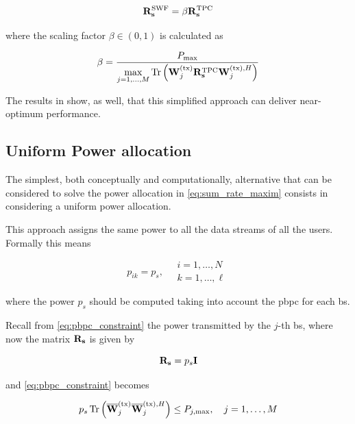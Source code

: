 \begin{equation} \label{eq:power_allocation_scaled}
    \mathbf{R}_{\mathbf{s}}^{\text{SWF}} = \beta \mathbf{R}_{\mathbf{s}}^{\text{TPC}}
\end{equation}

\noindent
where the scaling factor $\beta \in \left(0, 1\right)$ is calculated as

\begin{equation} \label{eq:scaling_factor}
    \beta = \frac{P_{\max}}{\max\limits_{j=1, \ldots, M} \operatorname*{Tr}\left(
    \mathbf{W}^{(\text{tx})}_j \mathbf{R}_{\mathbf{s}}^{\text{TPC}} \mathbf{W}^{(\text{tx}),H}_j \right)}
\end{equation}

The results in \cite{zhang09} show, as well, that this simplified approach can
deliver near-optimum performance.

\subsection{Uniform Power allocation}\label{ssec:uniform_allocation}

The simplest, both conceptually and computationally, alternative that can be
considered to solve the power allocation in \eqref{eq:sum_rate_maxim} consists
in considering a uniform power allocation.

This approach assigns the same power to all the data streams of all the
users. Formally this means

\begin{equation} \label{eq:equal_power}
    p_{ik} = p_{s}, \quad \begin{array}{l}
        i = 1, \ldots, N \\
        k = 1, \ldots, \ell
    \end{array}
\end{equation}

\noindent
where the power $p_s$ should be computed taking into account the \gls{pbpc} for
each \gls{bs}.

Recall from \eqref{eq:pbpc_constraint} the power transmitted by the $j$-th
\gls{bs}, where now the matrix $\mathbf{R}_{\mathbf{s}}$ is given by

\begin{equation} \label{eq:rs_equal}
    \mathbf{R}_{\mathbf{s}} = p_s \mathbf{I}
\end{equation}

\noindent
and \eqref{eq:pbpc_constraint} becomes

\begin{equation} \label{eq:pbpc_equal}
    p_s \operatorname*{Tr} \left( \mathbf{\overline{W}}^{(\text{tx})}_j \mathbf{\overline{W}}^{(\text{tx}),H}_j \right) \leq P_{j, \max}, \quad
    j = 1, \ldots, M
\end{equation}

